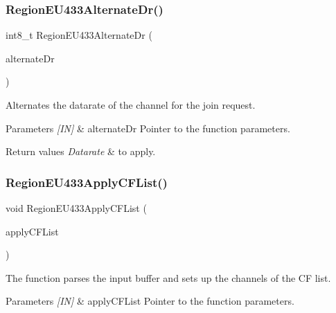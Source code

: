 \subsubsection{\texorpdfstring{Region\+E\+U433\+Alternate\+Dr()}{RegionEU433AlternateDr()}}
{\footnotesize\ttfamily int8\+\_\+t Region\+E\+U433\+Alternate\+Dr (\begin{DoxyParamCaption}\item[{\hyperlink{group__REGION_ga001ea4338d1c83f4c785b49d7ad2d696}{Alternate\+Dr\+Params\+\_\+t} $\ast$}]{alternate\+Dr }\end{DoxyParamCaption})}



Alternates the datarate of the channel for the join request. 


\begin{DoxyParams}{Parameters}
{\em \mbox{[}\+I\+N\mbox{]}} & alternate\+Dr Pointer to the function parameters.\\
\hline
\end{DoxyParams}

\begin{DoxyRetVals}{Return values}
{\em Datarate} & to apply. \\
\hline
\end{DoxyRetVals}
\mbox{\label{group__REGIONEU433_gacf5995b949053267e507f4e2063fc7bf}} 
\subsubsection{\texorpdfstring{Region\+E\+U433\+Apply\+C\+F\+List()}{RegionEU433ApplyCFList()}}
{\footnotesize\ttfamily void Region\+E\+U433\+Apply\+C\+F\+List (\begin{DoxyParamCaption}\item[{\hyperlink{group__REGION_ga71588e9ad07e34b78fa91d51881fd3c6}{Apply\+C\+F\+List\+Params\+\_\+t} $\ast$}]{apply\+C\+F\+List }\end{DoxyParamCaption})}



The function parses the input buffer and sets up the channels of the CF list. 


\begin{DoxyParams}{Parameters}
{\em \mbox{[}\+I\+N\mbox{]}} & apply\+C\+F\+List Pointer to the function parameters. \\
\hline
\end{DoxyParams}
\mbox{\label{group__REGIONEU433_ga1d0c43ec9e4539732c33e625f56104b2}} 
